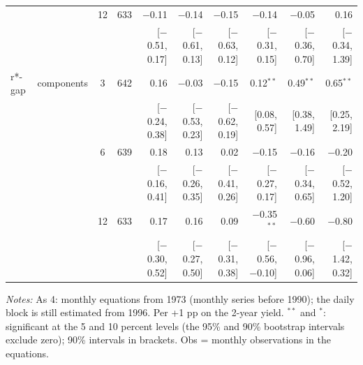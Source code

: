 \begin{longtable}{llcrrrrrrr}
 &  & 12 & 633 & $-$0.11 & $-$0.14 & $-$0.15 & $-$0.14 & $-$0.05 & 0.16\\
 & & & & {\scriptsize [$-$0.51, 0.17]} & {\scriptsize [$-$0.61, 0.13]} & {\scriptsize [$-$0.63, 0.12]} & {\scriptsize [$-$0.31, 0.15]} & {\scriptsize [$-$0.36, 0.70]} & {\scriptsize [$-$0.34, 1.39]}\\
\addlinespace
r*-gap & components & 3 & 642 & 0.16 & $-$0.03 & $-$0.15 & 0.12$^{**}$ & 0.49$^{**}$ & 0.65$^{**}$\\
 & & & & {\scriptsize [$-$0.24, 0.38]} & {\scriptsize [$-$0.53, 0.23]} & {\scriptsize [$-$0.62, 0.19]} & {\scriptsize [0.08, 0.57]} & {\scriptsize [0.38, 1.49]} & {\scriptsize [0.25, 2.19]}\\
 &  & 6 & 639 & 0.18 & 0.13 & 0.02 & $-$0.15 & $-$0.16 & $-$0.20\\
 & & & & {\scriptsize [$-$0.16, 0.41]} & {\scriptsize [$-$0.26, 0.35]} & {\scriptsize [$-$0.41, 0.26]} & {\scriptsize [$-$0.27, 0.17]} & {\scriptsize [$-$0.34, 0.65]} & {\scriptsize [$-$0.52, 1.20]}\\
 &  & 12 & 633 & 0.17 & 0.16 & 0.09 & $-$0.35$^{**}$ & $-$0.60 & $-$0.80\\
 & & & & {\scriptsize [$-$0.30, 0.52]} & {\scriptsize [$-$0.27, 0.50]} & {\scriptsize [$-$0.31, 0.38]} & {\scriptsize [$-$0.56, $-$0.10]} & {\scriptsize [$-$0.96, 0.06]} & {\scriptsize [$-$1.42, 0.32]}\\
\end{longtable}
\begin{flushleft}\footnotesize\textit{Notes:} As 4: monthly equations from 1973 (monthly series before 1990); the daily block is still estimated from 1996. Per +1 pp on the 2-year yield. $^{**}$ and $^{*}$: significant at the 5 and 10 percent levels (the 95\% and 90\% bootstrap intervals exclude zero); 90\% intervals in brackets. Obs = monthly observations in the equations.\end{flushleft}
\endgroup
